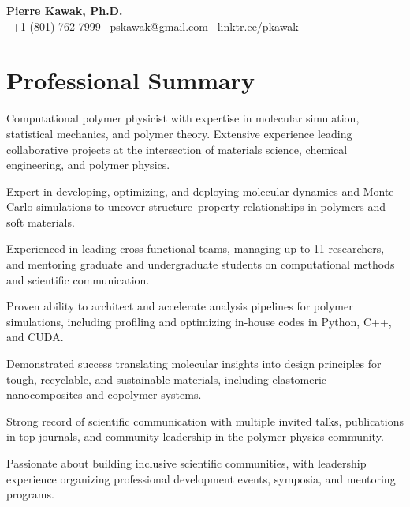 \documentclass[letterpaper,12pt]{article}
\begin{document}
\begin{center}
  {\LARGE \textbf{Pierre Kawak, Ph.D.}}\\
  \faPhone\ +1 (801) 762-7999 \quad \faEnvelope\ \href{mailto:pskawak@gmail.com}{pskawak@gmail.com} \quad \faLink\ \href{https://linktr.ee/pkawak}{linktr.ee/pkawak}
\end{center}

\vspace{-0.3\baselineskip}
\section*{Professional Summary}
Computational polymer physicist with expertise in molecular simulation, statistical mechanics, and polymer theory. Extensive experience leading collaborative projects at the intersection of materials science, chemical engineering, and polymer physics.
\vspace{0.5em}
\begin{tabitemize}
    \item Expert in developing, optimizing, and deploying molecular dynamics and Monte Carlo simulations to uncover structure–property relationships in polymers and soft materials.
    \item Experienced in leading cross-functional teams, managing up to 11 researchers, and mentoring graduate and undergraduate students on computational methods and scientific communication.
    \item Proven ability to architect and accelerate analysis pipelines for polymer simulations, including profiling and optimizing in-house codes in Python, C++, and CUDA.
    \item Demonstrated success translating molecular insights into design principles for tough, recyclable, and sustainable materials, including elastomeric nanocomposites and copolymer systems.
    \item Strong record of scientific communication with multiple invited talks, publications in top journals, and community leadership in the polymer physics community.
    \item Passionate about building inclusive scientific communities, with leadership experience organizing professional development events, symposia, and mentoring programs.
\end{tabitemize}

\vspace{-0.3\baselineskip}
\end{document}
